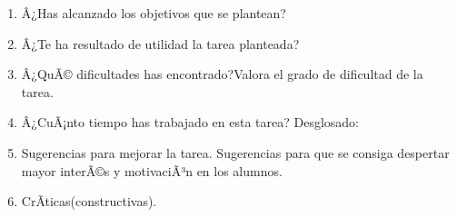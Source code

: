 \documentclass[10pt,a4paper]{article}
\begin{document}
\begin{enumerate}

	\item Â¿Has alcanzado los objetivos que se plantean? 
	
	\item Â¿Te ha resultado de utilidad la tarea planteada?

	\item Â¿QuÃ© dificultades has encontrado?Valora el grado de dificultad de la tarea.

	\item  Â¿CuÃ¡nto tiempo has trabajado en esta tarea? Desglosado:

		\begin{table}[H]
		\centering
		\end{table}

	\item  Sugerencias para mejorar la tarea. Sugerencias para que se consiga
	despertar mayor interÃ©s y motivaciÃ³n en los alumnos.\par

	\item  CrÃ­ticas(constructivas).

\end{enumerate} 

\newpage




\end{document}

